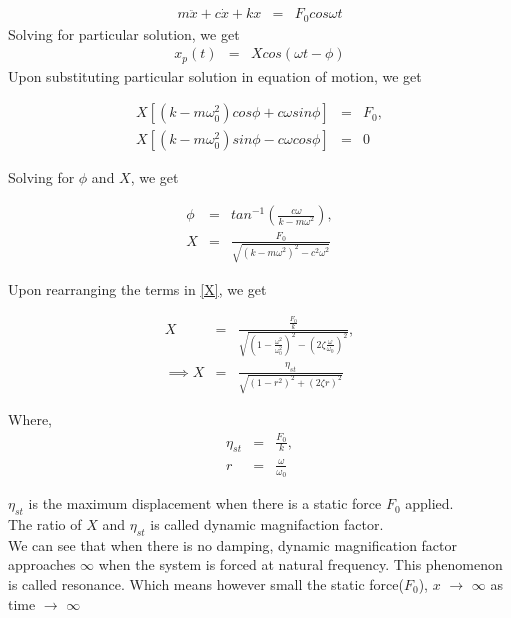 \documentclass[11pt]{article}
\begin{document}
\begin{eqnarray}
m\ddot{x} + c\dot{x} + kx &=& F_0cos\omega t
\end{eqnarray}
\noindent Solving for particular solution, we get
\begin{eqnarray}
x_p(t) &=& Xcos(\omega t - \phi)
\end{eqnarray}
\noindent Upon substituting particular solution in equation of motion, we get

\begin{eqnarray}
X[(k - m\omega_0^2)cos\phi + c\omega sin\phi] &=& F_0, \\ 
X[(k - m\omega_0^2)sin\phi - c\omega cos\phi] &=& 0 
\end{eqnarray}

\noindent Solving for $\phi$ and $X$, we get

\begin{eqnarray}
\phi &=& tan^{-1} \left( \frac{c\omega}{k - m\omega^2} \right), \\
\label{X}
X &=& \frac{F_0}{\sqrt{\left( k - m\omega^2\right)^2 - c^2\omega^2}}
\end{eqnarray}

\noindent Upon rearranging the terms in \ref{X}, we get 

\begin{eqnarray}
X &=& \frac{ \frac{F_0}{k} }{ \sqrt{ \left( 1 - \frac{\omega^2}{\omega_0^2} \right)^2 - \left( 2\zeta \frac{\omega}{\omega_0} \right)^2 } }, \\
\implies X &=& \frac{ \eta_{st} }{ \sqrt{ \left( 1 - r^2 \right)^2 + \left( 2\zeta r \right)^2 } } 
\end{eqnarray}

\noindent Where,
\begin{eqnarray}
\eta_{st} &=& \frac{F_0}{k}, \\
r &=& \frac{\omega}{\omega_0}
\end{eqnarray}

\noindent$\eta_{st}$ is the maximum displacement when there is a static force $F_0$ applied. \\
The ratio  of $X$ and $\eta_{st}$ is called dynamic magnifaction factor. \\
We can see that when there is no damping, dynamic magnification factor approaches $\infty$ 
when the system is forced at natural frequency. This phenomenon is called resonance. Which means 
however small the static force($F_0$), $x$ $\rightarrow$ $\infty$ as time $\rightarrow$ $\infty$
 
\end{document}
